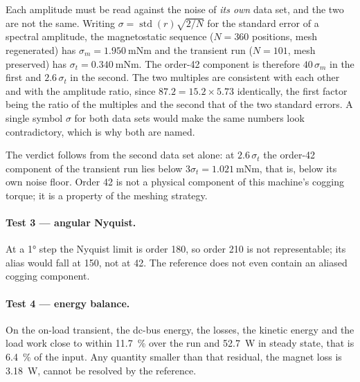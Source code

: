 \documentclass[10pt,a4paper,twocolumn]{article}
\theoremstyle{plain}
\theoremstyle{remark}
\begin{document}
Each amplitude must be read against the noise of \emph{its own} data
set, and the two are not the same. Writing
$\sigma=\operatorname{std}(r)\sqrt{2/N}$ for the standard error of a
spectral amplitude, the magnetostatic sequence
($N=360$ positions, mesh regenerated) has
$\sigma_m=\SI{1.950}{\milli\newton\metre}$ and the transient run
($N=101$, mesh preserved) has
$\sigma_t=\SI{0.340}{\milli\newton\metre}$. The order-42 component is
therefore $40\,\sigma_m$ in the first and $2.6\,\sigma_t$ in the second.
The two multiples are consistent with each other and with the amplitude
ratio, since $87.2=15.2\times5.73$ identically, the first factor being
the ratio of the multiples and the second that of the two standard
errors. A single symbol $\sigma$ for both data sets would make the same
numbers look contradictory, which is why both are named.

The verdict follows from the second data set alone: at
$2.6\,\sigma_t$ the order-42 component of the transient run lies below
$3\sigma_t=\SI{1.021}{\milli\newton\metre}$, that is, below its own
noise floor. Order 42 is not a physical component of this machine's
cogging torque; it is a property of the meshing strategy.

\paragraph{Test 3 --- angular Nyquist.}
At a \ang{1} step the Nyquist limit is order 180, so order 210 is not
representable; its alias would fall at 150, not at 42. The reference
does not even contain an aliased cogging component.

\paragraph{Test 4 --- energy balance.}
On the on-load transient, the dc-bus energy, the losses, the kinetic
energy and the load work close to within \SI{11.7}{\percent} over the
run and \SI{52.7}{\watt} in steady state, that is \SI{6.4}{\percent} of
the input. Any quantity smaller than that residual, the magnet loss is
\SI{3.18}{\watt}, cannot be resolved by the reference.
\end{document}
